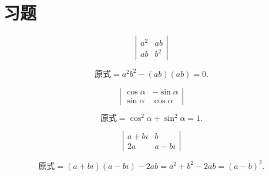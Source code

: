 \section{习题}

\begin{frame}
  \begin{footnotesize}
    \begin{exampleblock}{1}
      $$
      \left|
      \begin{array}{rr}
        a^2&ab\\
        ab&b^2
      \end{array}
      \right|
      $$
    \end{exampleblock}
    \pause 
    \jiename
    $$
    \mbox{原式} = a^2b^2-(ab)(ab) = 0.
    $$    
  \end{footnotesize}
\end{frame}


\begin{frame}
  \begin{footnotesize}
    \begin{exampleblock}{2}
      $$
      \left|
      \begin{array}{rr}
        \cos \alpha& -\sin \alpha\\
        \sin \alpha&  \cos \alpha
      \end{array}
      \right|
      $$
    \end{exampleblock}
    \pause 
    \jiename
    $$
    \mbox{原式} = \cos^2\alpha + \sin^2 \alpha= 1.
    $$    
  \end{footnotesize}
\end{frame}

\begin{frame}
  \begin{footnotesize}
    \begin{exampleblock}{3}
      $$
      \left|
      \begin{array}{cc}
        a+bi&b\\
        2a&a-bi
      \end{array}
      \right|
      $$      
    \end{exampleblock}
    \pause 
    \jiename
    $$
    \mbox{原式} = (a+bi)(a-bi)-2ab = a^2+b^2-2ab=(a-b)^2.
    $$ 
  \end{footnotesize}
\end{frame}


